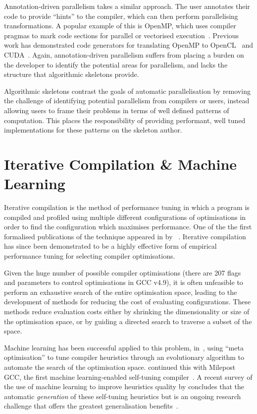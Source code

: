 Annotation-driven parallelism takes a similar approach. The user
annotates their code to provide ``hints'' to the compiler, which can
then perform parallelising transformations. A popular example of this
is OpenMP, which uses compiler pragmas to mark code sections for
parallel or vectorised execution~\cite{Dagum1998}. Previous work has
demonstrated code generators for translating OpenMP to
OpenCL~\cite{Grewe2013} and CUDA~\cite{Lee2009}. Again,
annotation-driven parallelism suffers from placing a burden on the
developer to identify the potential areas for parallelism, and lacks
the structure that algorithmic skeletons provide.

Algorithmic skeletons contrast the goals of automatic parallelisation
by removing the challenge of identifying potential parallelism from
compilers or users, instead allowing users to frame their problems in
terms of well defined patterns of computation. This places the
responsibility of providing performant, well tuned implementations for
these patterns on the skeleton author.


\section{Iterative Compilation \& Machine Learning}\label{sec:iterative-compilation}

Iterative compilation is the method of performance tuning in which a
program is compiled and profiled using multiple different
configurations of optimisations in order to find the configuration
which maximises performance. One of the the first formalised
publications of the technique appeared in \citeyear{Bodin1998} by
\citeauthor{Bodin1998}~\cite{Bodin1998}.  Iterative compilation has
since been demonstrated to be a highly effective form of empirical
performance tuning for selecting compiler optimisations.

Given the huge number of possible compiler optimisations (there are
207 flags and parameters to control optimisations in GCC v4.9), it is
often unfeasible to perform an exhaustive search of the entire
optimisation space, leading to the development of methods for reducing
the cost of evaluating configurations. These methods reduce evaluation
costs either by shrinking the dimensionality or size of the
optimisation space, or by guiding a directed search to traverse a
subset of the space.

Machine learning has been successful applied to this problem,
in~\cite{Stephenson2003}, using ``meta optimisation'' to tune compiler
heuristics through an evolutionary algorithm to automate the search of
the optimisation space. \citeauthor{Fursin2011} continued this with
Milepost GCC, the first machine learning-enabled self-tuning
compiler~\cite{Fursin2011}. A recent survey of the use of machine
learning to improve heuristics quality by \citeauthor{Burke2013}
concludes that the automatic \emph{generation} of these self-tuning
heuristics but is an ongoing research challenge that offers the
greatest generalisation benefits~\cite{Burke2013}.

